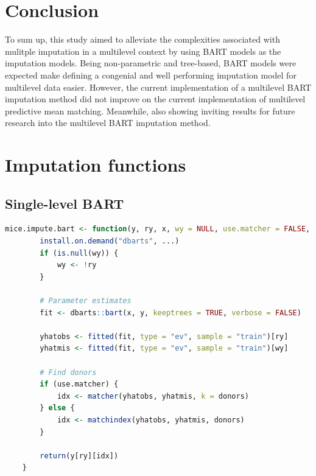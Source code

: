 \documentclass[3p,12pt,a4paper]{elsarticle}
\begin{document}
\section{Conclusion}

To sum up, this study aimed to alleviate the complexities associated with mulitple imputation in a multilevel context by using BART models as the imputation models. Being non-parametric and tree-based, BART models were expected make defining a congenial and well performing imputation model for multilevel data easier. However, the current implementation of a multilevel BART imputation method did not improve on the current implementation of multilevel predictive mean matching. Meanwhile, also showing inviting results for future research into the multilevel BART imputation method.

\newpage



\newpage
\appendix
\section{Imputation functions}
\subsection{Single-level BART}
\begin{lstlisting}[language=R, caption = {Imputation function for single-level BART}, label = {lst:singlelevelBART}]
    mice.impute.bart <- function(y, ry, x, wy = NULL, use.matcher = FALSE, donors = 5L, ...) {
        install.on.demand("dbarts", ...)
        if (is.null(wy)) {
            wy <- !ry
        }
    
        # Parameter estimates
        fit <- dbarts::bart(x, y, keeptrees = TRUE, verbose = FALSE)
    
        yhatobs <- fitted(fit, type = "ev", sample = "train")[ry]
        yhatmis <- fitted(fit, type = "ev", sample = "train")[wy]
    
        # Find donors
        if (use.matcher) {
            idx <- matcher(yhatobs, yhatmis, k = donors)
        } else {
            idx <- matchindex(yhatobs, yhatmis, donors)
        }
    
        return(y[ry][idx])
    }
\end{lstlisting}
\end{document}
